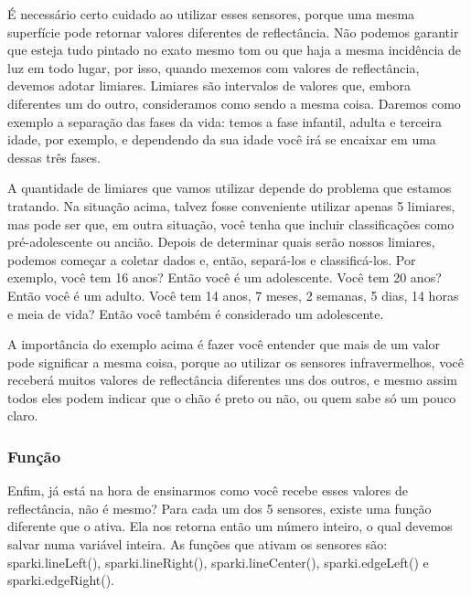 \documentclass[conference]{IEEEtran}
\begin{document}
\par
É necessário certo cuidado ao utilizar esses sensores, porque uma mesma superfície pode retornar valores diferentes de reflectância. Não podemos garantir que esteja tudo pintado no exato mesmo tom ou que haja a mesma incidência de luz em todo lugar, por isso, quando mexemos com valores de reflectância, devemos adotar limiares. Limiares são intervalos de valores que, embora diferentes um do outro, consideramos como sendo a mesma coisa. Daremos como exemplo a separação das fases da vida: temos a fase infantil, adulta e terceira idade, por exemplo, e dependendo da sua idade você irá se encaixar em uma dessas três fases.

\begin{table}[h]
    \centering
\end{table}
\par
A quantidade de limiares que vamos utilizar depende do problema que estamos tratando. Na situação acima, talvez fosse conveniente utilizar apenas 5 limiares, mas pode ser que, em outra situação, você tenha que incluir classificações como pré-adolescente ou ancião. Depois de determinar quais serão nossos limiares, podemos começar a coletar dados e, então, separá-los e classificá-los. Por exemplo, você tem 16 anos? Então você é um adolescente. Você tem 20 anos? Então você é um adulto. Você tem 14 anos, 7 meses, 2 semanas, 5 dias, 14 horas e meia de vida? Então você também é considerado um adolescente.
\par
A importância do exemplo acima é fazer você entender que mais de um valor pode significar a mesma coisa, porque ao utilizar os sensores infravermelhos, você receberá muitos valores de reflectância diferentes uns dos outros, e mesmo assim todos eles podem indicar que o chão é preto ou não, ou quem sabe só um pouco claro.

\begin{center}
    \subsubsection{Função}
\end{center}
\par
Enfim, já está na hora de ensinarmos como você recebe esses valores de reflectância, não é mesmo? Para cada um dos 5 sensores, existe uma função diferente que o ativa. Ela nos retorna então um número inteiro, o qual devemos salvar numa variável inteira. As funções que ativam os sensores são: sparki.lineLeft(), sparki.lineRight(), sparki.lineCenter(), sparki.edgeLeft() e sparki.edgeRight().
\end{document}
